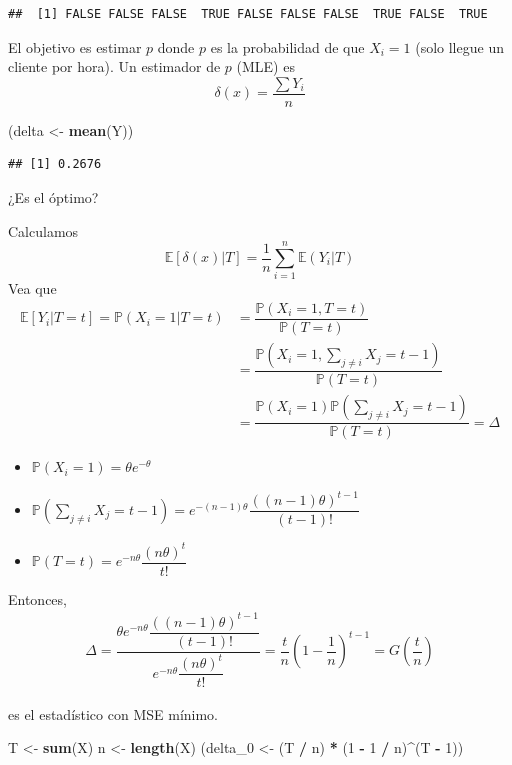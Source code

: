 \documentclass[
  12pt,
]{book}
\newenvironment{Shaded}{\begin{snugshade}}{\end{snugshade}}
\newcommand{\DecValTok}[1]{\textcolor[rgb]{0.00,0.00,0.81}{#1}}
\newcommand{\KeywordTok}[1]{\textcolor[rgb]{0.13,0.29,0.53}{\textbf{#1}}}
\newcommand{\NormalTok}[1]{#1}
\newcommand{\OperatorTok}[1]{\textcolor[rgb]{0.81,0.36,0.00}{\textbf{#1}}}
\newcommand{\StringTok}[1]{\textcolor[rgb]{0.31,0.60,0.02}{#1}}
\begin{document}
\begin{verbatim}
##  [1] FALSE FALSE FALSE  TRUE FALSE FALSE FALSE  TRUE FALSE  TRUE
\end{verbatim}

El objetivo es estimar \(p\) donde \(p\) es la probabilidad de que \(X_i =1\) (solo llegue un cliente por hora). Un estimador de \(p\) (MLE) es
\[\delta(x) = \dfrac{\sum Y_i}{n}\]

\begin{Shaded}
\begin{Highlighting}[]
\NormalTok{(delta \textless{}{-}}\StringTok{ }\KeywordTok{mean}\NormalTok{(Y))}
\end{Highlighting}
\end{Shaded}

\begin{verbatim}
## [1] 0.2676
\end{verbatim}

¿Es el óptimo?

Calculamos
\[\mathbb E[\delta(x)|T] = \dfrac 1n \sum_{i=1}^n \mathbb E (Y_i|T)\]
Vea que
\begin{align*}
\mathbb E[Y_i|T = t] = \mathbb P(X_i = 1 | T = t) & = \dfrac{\mathbb P(X_i = 1, T=t)}{\mathbb P(T=t)}\\
& = \dfrac{\mathbb P(X_i = 1, \sum_{j\ne i} X_j = t-1)}{\mathbb P(T=t)}\\
& = \dfrac{\mathbb P(X_i = 1) \mathbb P(\sum_{j\ne i} X_j = t-1)}{\mathbb P(T=t)} = \Delta
\end{align*}

\begin{itemize}
\item
  \(\mathbb P(X_i = 1) = \theta e^{-\theta}\)
\item
  \(\mathbb P(\sum_{j\ne i}X_j = t-1) = e^{-(n-1)\theta}\dfrac{((n-1)\theta)^{t-1}}{(t-1)!}\)
\item
  \(\mathbb P(T=t) = e^{-n\theta}\dfrac{(n\theta)^t}{t!}\)
\end{itemize}

Entonces,
\begin{align*}
\Delta = \dfrac{\theta e^{-n\theta}\dfrac{((n-1)\theta)^{t-1}}{(t-1)!}}{e^{-n\theta}\dfrac{(n\theta)^t}{t!}} = \dfrac tn \left(1-\dfrac 1n\right)^{t-1} = G\left(\dfrac tn\right)
\end{align*}

es el estadístico con MSE mínimo.

\begin{Shaded}
\begin{Highlighting}[]
\NormalTok{T \textless{}{-}}\StringTok{ }\KeywordTok{sum}\NormalTok{(X)}
\NormalTok{n \textless{}{-}}\StringTok{ }\KeywordTok{length}\NormalTok{(X)}
\NormalTok{(delta\_}\DecValTok{0}\NormalTok{ \textless{}{-}}\StringTok{ }\NormalTok{(T }\OperatorTok{/}\StringTok{ }\NormalTok{n) }\OperatorTok{*}\StringTok{ }\NormalTok{(}\DecValTok{1} \OperatorTok{{-}}\StringTok{ }\DecValTok{1} \OperatorTok{/}\StringTok{ }\NormalTok{n)}\OperatorTok{\^{}}\NormalTok{(T }\OperatorTok{{-}}\StringTok{ }\DecValTok{1}\NormalTok{))}
\end{Highlighting}
\end{Shaded}
\end{document}
